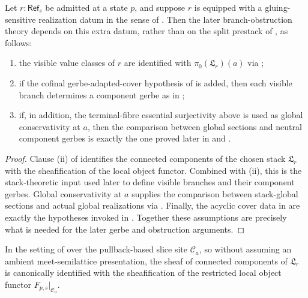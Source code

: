 \begin{proposition}\label{thm:gluing-sensitive-realization}
Let $r:\mathsf{Ref}_s$ be admitted at a state $p$, and suppose $r$ is equipped with a gluing-sensitive realization datum in the sense of . Then the later branch-obstruction theory depends on this extra datum, rather than on the split prestack of , as follows:
\begin{enumerate}[label=(\roman*),nosep]
\item the visible value classes of $r$ are identified with $\pi_0(\mathfrak L_r)(a)$ via ;
\item if the cofinal gerbe-adapted-cover hypothesis of  is added, then each visible branch determines a component gerbe as in ;
\item if, in addition, the terminal-fibre essential surjectivity above is used as global conservativity at $a$, then the comparison between global sections and neutral component gerbes is exactly the one proved later in  and .
\end{enumerate}
\end{proposition}

\begin{proof}
Clause \textup{(ii)} of  identifies the connected components of the chosen stack $\mathfrak L_r$ with the sheafification of the local object functor. Combined with (ii), this is the stack-theoretic input used later to define visible branches and their component gerbes. Global conservativity at $a$ supplies the comparison between stack-global sections and actual global realizations via . Finally, the acyclic cover data in  are exactly the hypotheses invoked in . Together these assumptions are precisely what is needed for the later gerbe and obstruction arguments.
\end{proof}

\begin{proposition}\label{prop:stackification-components}
In the setting of  over the pullback-based slice site $\mathcal C_a$, so without assuming an ambient meet-semilattice presentation, the sheaf of connected components of $\mathfrak L_r$ is canonically identified with the sheafification of the restricted local object functor $F_{p,s}|_{\mathcal C_a}$.
\end{proposition}


